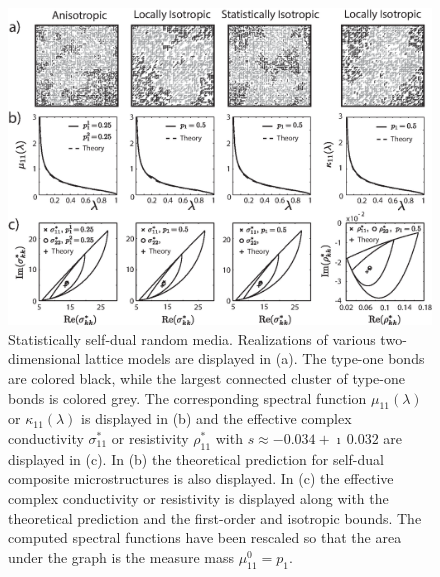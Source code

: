 \documentclass{cmslatex}
\begin{document}
%
%
\begin{figure}[t]
  \centerline{\includegraphics[scale=0.69]{A_Duality_RRN_11.eps}}
\caption{Statistically self-dual random media. Realizations of various 
  two-dimensional lattice models are displayed in (a). The type-one
  bonds are colored black, while the largest connected cluster of
  type-one bonds is colored grey. The corresponding spectral function
  $\mu_{11}(\lambda)$ or $\kappa_{11}(\lambda)$ is displayed in (b) and the effective
  complex conductivity $\sigma^*_{11}$ or resistivity $\rho^*_{11}$ with
  $s\approx-0.034+\imath\,0.032$ are displayed in (c). In
  (b) the theoretical prediction for self-dual composite
  microstructures is also displayed. In (c) the effective 
  complex conductivity or resistivity is displayed along with the
  theoretical prediction and the first-order and isotropic bounds. The
  computed spectral functions have been rescaled so that the area
  under the graph is the measure mass $\mu^0_{11}=p_1$.                
        }
\label{fig:Duality_RRN_11}
\end{figure}
%
\end{document}
